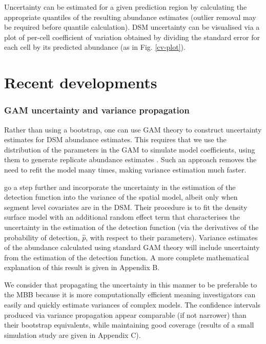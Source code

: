 \documentclass[a4paper,12pt]{article}
\begin{document}
Uncertainty can be estimated for a given prediction region by calculating the appropriate quantiles of the resulting abundance estimates (outlier removal may be required before quantile calculation). DSM uncertainty can be visualised via a plot of per-cell coefficient of variation obtained by dividing the standard error for each cell by its predicted abundance (as in Fig. \ref{cv-plot}). 

\section*{Recent developments}
\label{s:recentadvances}

\subsubsection*{GAM uncertainty and variance propagation}

Rather than using a bootstrap, one can use GAM theory to construct uncertainty estimates for DSM abundance estimates. This requires that we use the distribution of the parameters in the GAM to simulate model coefficients, using them to generate replicate abundance estimates \citep[further information can found in][page 245]{Wood:2006wz}. Such an approach removes the need to refit the model many times, making variance estimation much faster.
 
\cite{WILLIAMS:2011in} go a step further and incorporate the uncertainty in the estimation of the detection function into the variance of the spatial model, albeit only when segment level covariates are in the DSM. Their procedure is to fit the density surface model with an additional random effect term that characterises the uncertainty in the estimation of the detection function (via the derivatives of the probability of detection, $\hat{p}$, with respect to their parameters). Variance estimates of the abundance calculated using standard GAM theory will include uncertainty from the estimation of the detection function. A more complete mathematical explanation of this result is given in Appendix B.

We consider that propagating the uncertainty in this manner to be preferable to the MBB because it is more computationally efficient meaning investigators can easily and quickly estimate variances of complex models. The confidence intervals produced via variance propagation appear comparable (if not narrower) than their bootstrap equivalents, while maintaining good coverage (results of a small simulation study are given in Appendix C).
\end{document}
